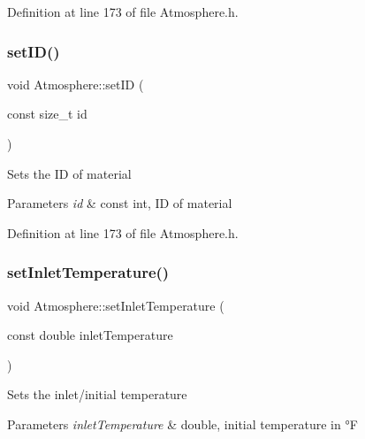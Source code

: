 Definition at line 173 of file Atmosphere.\+h.

\mbox{\label{class_atmosphere_a156e09f05336057be5591146948f6046}} 
\subsubsection{\texorpdfstring{set\+I\+D()}{setID()}\hspace{0.1cm}{\footnotesize\ttfamily [3/3]}}
{\footnotesize\ttfamily void Atmosphere\+::set\+ID (\begin{DoxyParamCaption}\item[{const size\+\_\+t}]{id }\end{DoxyParamCaption})\hspace{0.3cm}{\ttfamily [inline]}}

Sets the ID of material 
\begin{DoxyParams}{Parameters}
{\em id} & const int, ID of material \\
\hline
\end{DoxyParams}


Definition at line 173 of file Atmosphere.\+h.

\mbox{\label{class_atmosphere_a592bf7f82ea518fbd9da86d8f10cbc5c}} 
\subsubsection{\texorpdfstring{set\+Inlet\+Temperature()}{setInletTemperature()}\hspace{0.1cm}{\footnotesize\ttfamily [1/3]}}
{\footnotesize\ttfamily void Atmosphere\+::set\+Inlet\+Temperature (\begin{DoxyParamCaption}\item[{const double}]{inlet\+Temperature }\end{DoxyParamCaption})\hspace{0.3cm}{\ttfamily [inline]}}

Sets the inlet/initial temperature 
\begin{DoxyParams}{Parameters}
{\em inlet\+Temperature} & double, initial temperature in °F \\
\hline
\end{DoxyParams}


